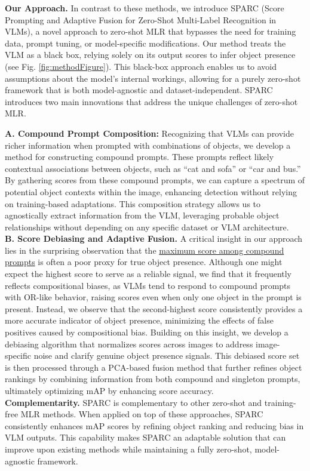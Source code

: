 \noindent \textbf{Our Approach.} In contrast to these methods, we introduce SPARC (Score Prompting and Adaptive Fusion for Zero-Shot Multi-Label Recognition in VLMs), a novel approach to zero-shot MLR that bypasses the need for training data, prompt tuning, or model-specific modifications. Our method treats the VLM as a black box, relying solely on its output scores to infer object presence (see Fig. \ref{fig:methodFigure}). This black-box approach enables us to avoid assumptions about the model’s internal workings, allowing for a purely zero-shot framework that is both model-agnostic and dataset-independent. SPARC introduces two main innovations that address the unique challenges of zero-shot MLR.

\noindent \textbf{A. Compound Prompt Composition:} Recognizing that VLMs can provide richer information when prompted with combinations of objects, we develop a method for constructing compound prompts. These prompts reflect likely contextual associations between objects, such as “cat and sofa” or “car and bus.” By gathering scores from these compound prompts, we can capture a spectrum of potential object contexts within the image, enhancing detection without relying on training-based adaptations. This composition strategy allows us to agnostically extract information from the VLM, leveraging probable object relationships without depending on any specific dataset or VLM architecture.\\
\noindent \textbf{B. Score Debiasing and Adaptive Fusion.} A critical insight in our approach lies in the surprising observation that the \underline{maximum score among compound prompts} is often a poor proxy for true object presence. Although one might expect the highest score to serve as a reliable signal, we find that it frequently reflects compositional biases, as VLMs tend to respond to compound prompts with OR-like behavior, raising scores even when only one object in the prompt is present. Instead, we observe that the second-highest score consistently provides a more accurate indicator of object presence, minimizing the effects of false positives caused by compositional bias. Building on this insight, we develop a debiasing algorithm that normalizes scores across images to address image-specific noise and clarify genuine object presence signals. This debiased score set is then processed through a PCA-based fusion method that further refines object rankings by combining information from both compound and singleton prompts, ultimately optimizing mAP by enhancing score accuracy.\\
\textbf{Complementarity.} SPARC is complementary to other zero-shot and training-free MLR methods. When applied on top of these approaches, SPARC consistently enhances mAP scores by refining object ranking and reducing bias in VLM outputs. This capability makes SPARC an adaptable solution that can improve upon existing methods while maintaining a fully zero-shot, model-agnostic framework.

